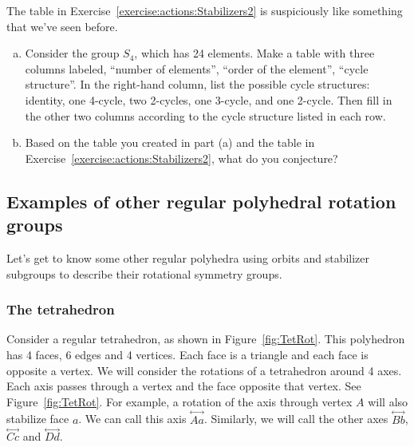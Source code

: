 \begin{exercise}\label{exercise:actions:Stabilizers2b}
The table in Exercise~\ref{exercise:actions:Stabilizers2} is suspiciously like something that we've seen before.
\begin{enumerate}[(a)]
\item
Consider the group $S_4$, which has 24 elements. Make a table with three columns labeled, ``number of elements'', ``order of the element'', ``cycle structure''.  In the right-hand column, list the possible cycle structures: identity, one 4-cycle, two 2-cycles, one 3-cycle, and one 2-cycle. Then fill in the other two columns according to the cycle structure listed in each row.
\item Based on the table you created in part (a) and the table in Exercise~\ref{exercise:actions:Stabilizers2}, what do you conjecture?
\end{enumerate}
\end{exercise}
\subsection{Examples of other regular polyhedral rotation groups}
Let's get to know some other regular polyhedra using orbits and stabilizer subgroups to describe their rotational symmetry groups.
\subsubsection*{The tetrahedron}
Consider a regular tetrahedron, as shown in Figure~\ref{fig:TetRot}. This polyhedron has 4 faces, 6 edges and 4 vertices.  Each face is a triangle and each face is opposite a vertex. We will consider the rotations of a tetrahedron around 4 axes.  Each axis passes through a vertex and the face opposite that vertex. See Figure~\ref{fig:TetRot}. For example, a rotation of the axis through vertex $A$ will also stabilize face $a$.  We can call this axis $\overset{\leftrightarrow}{Aa}$.  Similarly, we will call the other axes $\overset{\leftrightarrow}{Bb}$, $\overset{\leftrightarrow}{Cc}$ and $\overset{\leftrightarrow}{Dd}$.

